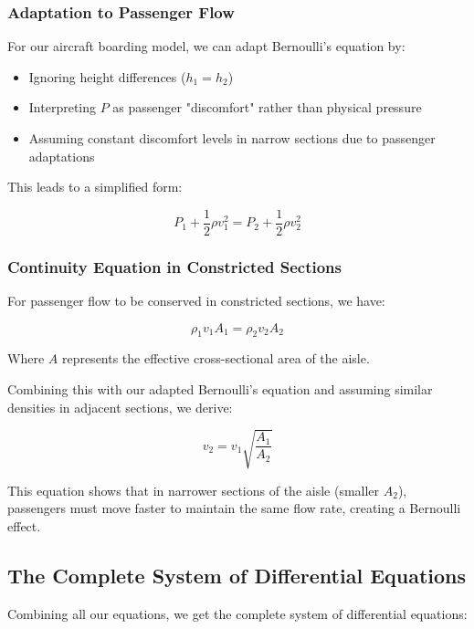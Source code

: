 \documentclass[a4paper,12pt]{article}
\begin{document}
\subsubsection{Adaptation to Passenger Flow}

For our aircraft boarding model, we can adapt Bernoulli's equation by:
\begin{itemize}
    \item Ignoring height differences ($h_1 = h_2$)
    \item Interpreting $P$ as passenger "discomfort" rather than physical pressure
    \item Assuming constant discomfort levels in narrow sections due to passenger adaptations
\end{itemize}

This leads to a simplified form:

\begin{equation}
P_1 + \frac{1}{2}\rho v_1^2 = P_2 + \frac{1}{2}\rho v_2^2
\end{equation}

\subsubsection{Continuity Equation in Constricted Sections}

For passenger flow to be conserved in constricted sections, we have:

\begin{equation}
\rho_1 v_1 A_1 = \rho_2 v_2 A_2
\end{equation}

Where $A$ represents the effective cross-sectional area of the aisle.

Combining this with our adapted Bernoulli's equation and assuming similar densities in adjacent sections, we derive:

\begin{equation}
v_2 = v_1\sqrt{\frac{A_1}{A_2}}
\end{equation}

This equation shows that in narrower sections of the aisle (smaller $A_2$), passengers must move faster to maintain the same flow rate, creating a Bernoulli effect.

\subsection{The Complete System of Differential Equations}

Combining all our equations, we get the complete system of differential equations:
\end{document}

